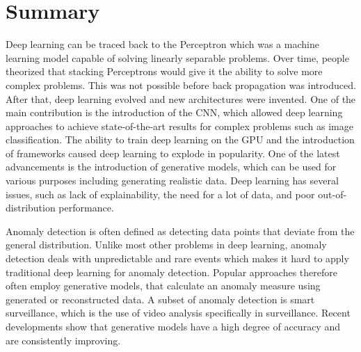 \section{Summary}
Deep learning can be traced back to the Perceptron which was a machine learning model capable of solving linearly separable problems. Over time, people theorized that stacking Perceptrons would give it the ability to solve more complex problems. This was not possible before back propagation was introduced. After that, deep learning evolved and new architectures were invented. One of the main contribution is the introduction of the CNN, which allowed deep learning approaches to achieve state-of-the-art results for complex problems such as image classification. The ability to train deep learning on the GPU and the introduction of frameworks caused deep learning to explode in popularity. One of the latest advancements is the introduction of generative models, which can be used for various purposes including generating realistic data. Deep learning has several issues, such as lack of explainability, the need for a lot of data, and poor out-of-distribution performance.
\par
Anomaly detection is often defined as detecting data points that deviate from the general distribution. Unlike most other problems in deep learning, anomaly detection deals with unpredictable and rare events which makes it hard to apply traditional deep learning for anomaly detection. Popular approaches therefore often employ generative models, that calculate an anomaly measure using generated or reconstructed data. A subset of anomaly detection is smart surveillance, which is the use of video analysis specifically in surveillance. Recent developments show that generative models have a high degree of accuracy and are consistently improving.
\par
